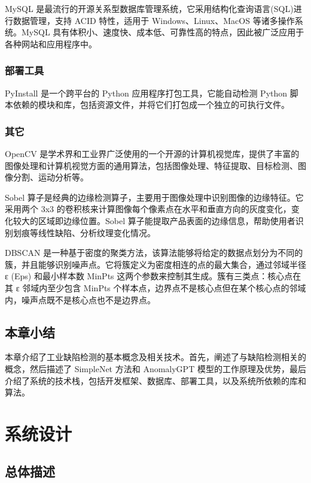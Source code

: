 \documentclass[
  ]{njuthesis}
\begin{document}
MySQL 是最流行的开源关系型数据库管理系统，它采用结构化查询语言(SQL)进行数据管理，支持 ACID 特性，适用于 Windows、Linux、MacOS 等诸多操作系统。MySQL 具有体积小、速度快、成本低、可靠性高的特点，因此被广泛应用于各种网站和应用程序中。

\subsection{部署工具}

PyInstall 是一个跨平台的 Python 应用程序打包工具，它能自动检测 Python 脚本依赖的模块和库，包括资源文件，并将它们打包成一个独立的可执行文件。

\subsection{其它}

OpenCV 是学术界和工业界广泛使用的一个开源的计算机视觉库，提供了丰富的图像处理和计算机视觉方面的通用算法，包括图像处理、特征提取、目标检测、图像分割、运动分析等。

Sobel 算子是经典的边缘检测算子，主要用于图像处理中识别图像的边缘特征。它采用两个 3x3 的卷积核来计算图像每个像素点在水平和垂直方向的灰度变化，变化较大的区域即边缘位置。Sobel 算子能提取产品表面的边缘信息，帮助使用者识别划痕等线性缺陷、分析纹理变化情况。

DBSCAN 是一种基于密度的聚类方法，该算法能够将给定的数据点划分为不同的簇，并且能够识别噪声点。它将簇定义为密度相连的点的最大集合，通过邻域半径 ε (Eps) 和最小样本数 MinPts 这两个参数来控制其生成。簇有三类点：核心点在其 ε 邻域内至少包含 MinPts 个样本点，边界点不是核心点但在某个核心点的邻域内，噪声点既不是核心点也不是边界点。

\section{本章小结}

本章介绍了工业缺陷检测的基本概念及相关技术。首先，阐述了与缺陷检测相关的概念，然后描述了 SimpleNet 方法和 AnomalyGPT 模型的工作原理及优势，最后介绍了系统的技术栈，包括开发框架、数据库、部署工具，以及系统所依赖的库和算法。

\chapter{系统设计}

\section{总体描述}
\end{document}
